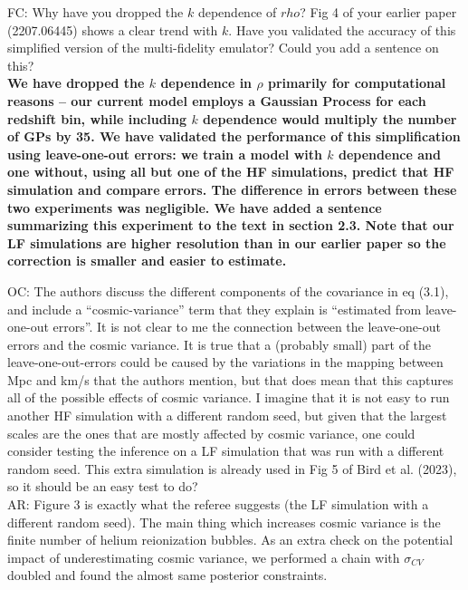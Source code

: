 \documentclass[12pt]{article}
\begin{document}
FC: Why have you dropped the $k$ dependence of $rho$? Fig 4 of your earlier paper (2207.06445) shows a clear trend with $k$. Have you validated the accuracy of this simplified version of the multi-fidelity emulator? Could you add a sentence on this?\\

\textbf{We have dropped the $k$ dependence in $\rho$ primarily for computational reasons -- our current model employs a Gaussian Process for each redshift bin, while including $k$ dependence would multiply the number of GPs by 35. We have validated the performance of this simplification using leave-one-out errors: we train a model with $k$ dependence and one without, using all but one of the HF simulations, predict that HF simulation and compare errors. The difference in errors between these two experiments was negligible. We have added a sentence summarizing this experiment to the text in section 2.3. Note that our LF simulations are higher resolution than in our earlier paper so the correction is smaller and easier to estimate.}\\

\hrulefill \newline

OC: The authors discuss the different components of the covariance in eq (3.1), and include a “cosmic-variance” term that they explain is “estimated from leave-one-out errors”. It is not clear to me the connection between the leave-one-out errors and the cosmic variance. It is true that a (probably small) part of the leave-one-out-errors could be caused by the variations in the mapping between Mpc and km/s that the authors mention, but that does mean that this captures all of the possible effects of cosmic variance. I imagine that it is not easy to run another HF simulation with a different random seed, but given that the largest scales are the ones that are mostly affected by cosmic variance, one could consider testing the inference on a LF simulation that was run with a different random seed. This extra simulation is already used in Fig 5 of Bird et al. (2023), so it should be an easy test to do?\\

AR: Figure 3 is exactly what the referee suggests (the LF simulation with a different random seed). The main thing which increases cosmic variance is the finite number of helium reionization bubbles. As an extra check on the potential impact of underestimating cosmic variance, we performed a chain with $\sigma_{CV}$ doubled and found the almost same posterior constraints.\\
\end{document}

